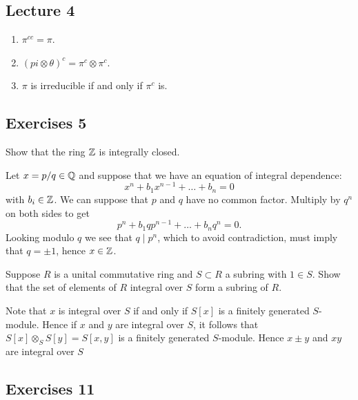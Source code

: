 \documentclass[11pt, english]{article}
\begin{document}
\subsection{Lecture 4}

\begin{exc}
  \begin{enumerate}
  \item $\pi^{cc}=\pi$.
\item $(pi \otimes \theta)^c = \pi^c \otimes \pi^c$.
\item $\pi$ is irreducible if and only if $\pi^c$ is.
  \end{enumerate}
\end{exc}

\subsection{Exercises 5}

\begin{exc}[Excercise 1]
Show that the ring $\mathbb{Z}$ is integrally closed.
\end{exc}
\begin{sol}
Let $x=p/q \in \mathbb{Q}$ and suppose that we have an equation of integral dependence:
$$
x^n + b_1x^{n-1} + \ldots + b_n = 0
$$
with $b_i \in \mathbb{Z}$. We can suppose that $p$ and $q$ have no common factor. Multiply by $q^n$ on both sides to get
$$
p^n+b_1qp^{n-1} + \ldots+b_nq^n = 0.
$$
Looking modulo $q$ we see that $q \mid p^n$, which to avoid contradiction, must imply that $q=\pm 1$, hence $x \in \mathbb{Z}$.
\end{sol}

\begin{exc}[Exercise 2]
Suppose $R$ is a unital commutative ring and $S \subset R$ a subring with $1 \in S$. Show that the set of elements of $R$ integral over $S$ form a subring of $R$.
\end{exc}
\begin{sol}
 Note that $x$ is integral over $S$ if and only if $S[x]$ is a finitely generated $S$-module. Hence if $x$ and $y$ are integral over $S$, it follows that $S[x] \otimes_S S[y] = S[x,y]$ is a finitely generated $S$-module. Hence $x \pm y$ and $xy$ are integral over $S$
\end{sol}

\subsection{Exercises 11}
\end{document}
